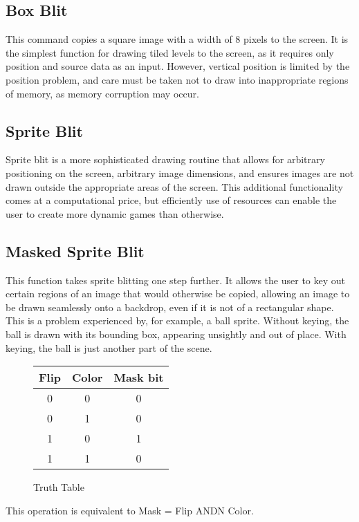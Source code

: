 \subsection*{Box Blit}

This command copies a square image with a width of 8 pixels to the screen.  It is the simplest function for drawing tiled levels to the screen, as it requires only position and source data as an input.  However, vertical position is limited by the position problem, and care must be taken not to draw into inappropriate regions of memory, as memory corruption may occur.




\subsection*{Sprite Blit}

Sprite blit is a more sophisticated drawing routine that allows for arbitrary positioning on the screen, arbitrary image dimensions, and ensures images are not drawn outside the appropriate areas of the screen.  This additional functionality comes at a computational price, but efficiently use of resources can enable the user to create more dynamic games than otherwise.





\subsection*{Masked Sprite Blit}

This function takes sprite blitting one step further.  It allows the user to key out certain regions of an image that would otherwise be copied, allowing an image to be drawn seamlessly onto a backdrop, even if it is not of a rectangular shape.  This is a problem experienced by, for example, a ball sprite.  Without keying, the ball is drawn with its bounding box, appearing unsightly and out of place.  With keying, the ball is just another part of the scene.

\begin{figure}[H]
	\centering
	
		\begin{tabular} {c c | c}
		Flip & Color & Mask bit \\
		\hline
		0 & 0 & 0 \\
		0 & 1 & 0 \\
		1 & 0 & 1 \\
		1 & 1 & 0 \\
		\end{tabular}
		
	\label{maskblittruthtable}
	\caption{Truth Table}

\end{figure}

This operation is equivalent to Mask = Flip ANDN Color.


\lstset{style=C++}
